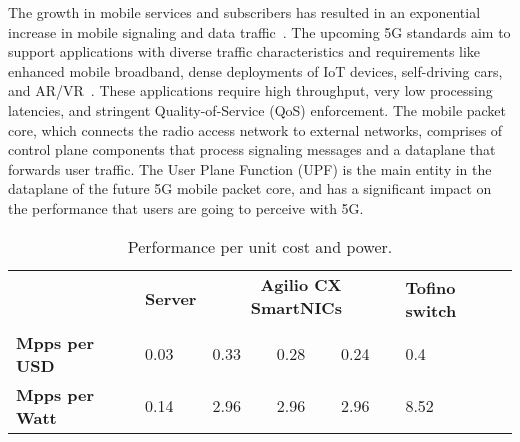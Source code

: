 The growth in mobile services and subscribers has resulted in an exponential increase in mobile signaling and data traffic~\cite{stats-ericsson, stats-1, stats-2, 5g-stats}. The upcoming 5G standards aim to support applications with diverse traffic characteristics and requirements like enhanced mobile broadband, dense deployments of IoT devices, self-driving cars, and AR/VR~\cite{ngmn, 5g-iot-chk}. These applications require high throughput, very low processing latencies, and stringent Quality-of-Service (QoS) enforcement. The mobile packet core, which connects the radio access network to external networks, comprises of control plane components that process signaling messages and a dataplane that forwards user traffic. The User Plane Function (UPF) is the main entity in the dataplane of the future 5G mobile packet core, and has a significant impact on the performance that users are going to perceive with 5G. 

\begin{table}[t]
\begin{scriptsize}
\begin{center}
\def\arraystretch{1.5}%
\begin{tabular}{|p{1.7cm}|p{0.9cm}|p{0.7cm}|p{0.7cm}|p{0.7cm}|p{1.4cm}|}\hline 
&  \multirow{2}{*}{\bf{Server}} & \multicolumn{3}{c|}{\bf{Agilio CX SmartNICs~\cite{netronome-cx-4000,netronome-cost}}} & \multirow{2}{*}{\bf{Tofino switch}}  \\ %
& {\bf{\cite{xeon-processor, 40G-nic-cost}}}  &  {\bf{\cite{netronome}}} &  {\bf{\cite{netronome-25G}}}   & {\bf{\cite{netronome-40G}}}  & {\bf{\cite{tofino-2}}}  \\ \hline 
 
{\bf{Mpps per USD}} & 0.03 & 0.33  & 0.28 & 0.24  & 0.4  \\ \hline
{\bf{Mpps per Watt}} & 0.14 & 2.96 & 2.96 & 2.96 & 8.52  \\ \hline
\end{tabular}
\setlength{\abovecaptionskip}{-12pt}
\setlength{\belowcaptionskip}{0pt}
\caption{Performance per unit cost and power.} 
\label{tab:cost-power}
\end{center}
\end{scriptsize}
\end{table}

